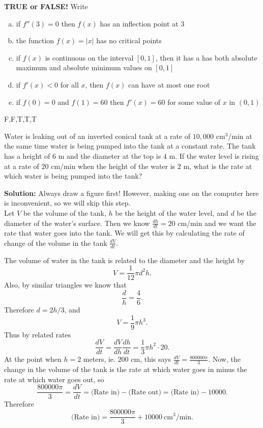 \documentclass[11pt]{exam}
\theoremstyle{definition}
\begin{document}
\begin{questions}

\addpoints

\question[10]\mbox{}
\textbf{TRUE or FALSE!}  Write 
\begin{enumerate}[(a)]
\item if $f''(3) = 0$ then $f(x)$ has an inflection point at $3$
\vspace{1.2in}
\item the function $f(x) = |x|$ has no critical points
\vspace{1.2in}
\item if $f(x)$ is continuous on the interval $[0,1]$, then it has a has both absolute maximum and absolute minimum values on $[0,1]$
\vspace{1.2in}
\item if $f'(x) < 0$ for all $x$, then $f(x)$ can have at most one root
\vspace{1.2in}
\item if $f(0)=0$ and $f(1)=60$ then $f'(x)=60$ for some value of $x$ in $(0,1)$
\vspace{1.2in}
\end{enumerate}

F,F,T,T,T

\newpage
\question[10]\mbox{}
Water is leaking out of an inverted conical tank at a rate of $10,000$ cm$^3$/min at the same time water is being pumped into the tank at a constant rate.
The tank has a height of $6$ m and the diameter at the top is $4$ m.
If the water level is rising at a rate of $20$ cm/min when the height of the water is $2$ m, what is the rate at which water is being pumped into the tank?

\textbf{Solution:} 
Always draw a figure first!  However, making one on the computer here is inconvenient, so we will skip this step.\\
Let $V$ be the volume of the tank, $h$ be the height of the water level, and $d$ be the diameter of the water's surface.
Then we know $\frac{dh}{dt} = 20$ cm/min and we want the rate that water goes into the tank.
We will get this by calculating the rate of change of the volume in the tank $\frac{dV}{dt}$.

The volume of water in the tank is related to the diameter and the height by
$$V = \frac{1}{12}\pi d^2h.$$
Also, by similar triangles we know that
$$\frac{d}{h} = \frac{4}{6}.$$
Therefore $d = 2h/3$, and
$$V = \frac{1}{9}\pi h^3.$$
Thus by related rates
$$\frac{dV}{dt} = \frac{dV}{dh}\frac{dh}{dt} = \frac{1}{3}\pi h^2\cdot 20.$$
At the point when $h=2$ meters, ie. $200$ cm, this says $\frac{dV}{dt} = \frac{800000\pi}{3}$.
Now, the change in the volume of the tank is the rate at which water goes in minus the rate at which water goes out, so
$$\frac{800000\pi}{3} = \frac{dV}{dt} = \text{(Rate in)} - \text{(Rate out)} = \text{(Rate in)} - 10000.$$
Therefore
$$\text{(Rate in)} = \frac{800000\pi}{3} + 10000\ \text{cm$^3$/min}.$$


\end{questions}
\end{document}
